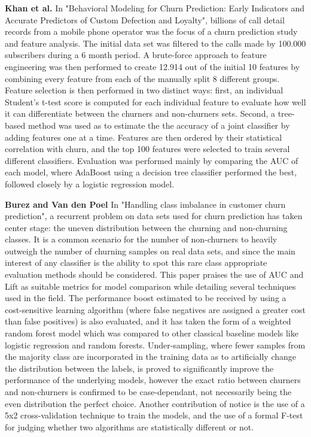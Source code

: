 \documentclass{kththesis}
\begin{document}
\textbf{Khan et al.} \citep{Khan2015} In "Behavioral Modeling for Churn Prediction: Early Indicators and Accurate Predictors of Custom Defection and Loyalty", billions of call detail records from a mobile phone operator was the focus of a churn prediction study and feature analysis. The initial data set was filtered to the calls made by 100.000 subscribers during a 6 month period. A brute-force approach to feature engineering was then performed to create 12.914 out of the initial 10 features by combining every feature from each of the manually split 8 different groups. Feature selection is then performed in two distinct ways: first, an individual Student's t-test score is computed for each individual feature to evaluate how well it can differentiate between the churners and non-churners sets. Second, a tree-based method was used as to estimate the the accuracy of a joint classifier by adding features one at a time. Features are then ordered by their statistical correlation with churn, and the top 100 features were selected to train several different classifiers. Evaluation was performed mainly by comparing the AUC of each model, where AdaBoost using a decision tree classifier performed the best, followed closely by a logistic regression model.

\textbf{Burez and Van den Poel} \citep{Burez2009} In "Handling class imbalance in customer churn prediction", a recurrent problem on data sets used for churn prediction has taken center stage: the uneven distribution between the churning and non-churning classes. It is a common scenario for the number of non-churners to heavily outweigh the number of churning samples on real data sets, and since the main interest of any classifier is the ability to spot this rare class appropriate evaluation methods should be considered. This paper praises the use of AUC and Lift as suitable metrics for model comparison while detailing several techniques used in the field. The performance boost estimated to be received by using a cost-sensitive learning algorithm (where false negatives are assigned a greater cost than false positives) is also evaluated, and it has taken the form of a weighted random forest model which was compared to other classical baseline models like logistic regression and random forests. Under-sampling, where fewer samples from the majority class are incorporated in the training data as to artificially change the distribution between the labels, is proved to significantly improve the performance of the underlying models, however the exact ratio between churners and non-churners is confirmed to be case-dependant, not necessarily being the even distribution the perfect choice. Another contribution of notice is the use of a 5x2 cross-validation technique to train the models, and the use of a formal F-test for judging whether two algorithms are statistically different or not.
\end{document}
